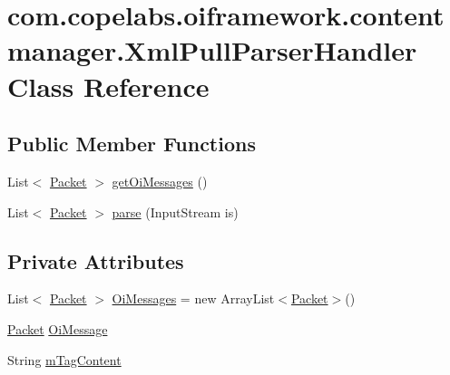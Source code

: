 \hypertarget{classcom_1_1copelabs_1_1oiframework_1_1contentmanager_1_1_xml_pull_parser_handler}{}\section{com.\+copelabs.\+oiframework.\+contentmanager.\+Xml\+Pull\+Parser\+Handler Class Reference}
\label{classcom_1_1copelabs_1_1oiframework_1_1contentmanager_1_1_xml_pull_parser_handler}
\subsection*{Public Member Functions}
\begin{DoxyCompactItemize}
\item 
List$<$ \hyperlink{classcom_1_1copelabs_1_1oiframework_1_1contentmanager_1_1_packet}{Packet} $>$ \hyperlink{classcom_1_1copelabs_1_1oiframework_1_1contentmanager_1_1_xml_pull_parser_handler_afae0940bf594c591e5f19371faf24269}{get\+Oi\+Messages} ()
\item 
List$<$ \hyperlink{classcom_1_1copelabs_1_1oiframework_1_1contentmanager_1_1_packet}{Packet} $>$ \hyperlink{classcom_1_1copelabs_1_1oiframework_1_1contentmanager_1_1_xml_pull_parser_handler_a14a62f051b38cddf20f38ddd85f04711}{parse} (Input\+Stream is)
\end{DoxyCompactItemize}
\subsection*{Private Attributes}
\begin{DoxyCompactItemize}
\item 
List$<$ \hyperlink{classcom_1_1copelabs_1_1oiframework_1_1contentmanager_1_1_packet}{Packet} $>$ \hyperlink{classcom_1_1copelabs_1_1oiframework_1_1contentmanager_1_1_xml_pull_parser_handler_a4e6660ea84c1f1594aaec8f8b7cb98a8}{Oi\+Messages} = new Array\+List$<$\hyperlink{classcom_1_1copelabs_1_1oiframework_1_1contentmanager_1_1_packet}{Packet}$>$()
\item 
\hyperlink{classcom_1_1copelabs_1_1oiframework_1_1contentmanager_1_1_packet}{Packet} \hyperlink{classcom_1_1copelabs_1_1oiframework_1_1contentmanager_1_1_xml_pull_parser_handler_a1f117f2bfb10ad89085ef85c55f6cc9c}{Oi\+Message}
\item 
String \hyperlink{classcom_1_1copelabs_1_1oiframework_1_1contentmanager_1_1_xml_pull_parser_handler_a5d5c0819f1a1238b8ac06622f979d8f4}{m\+Tag\+Content}
\end{DoxyCompactItemize}


